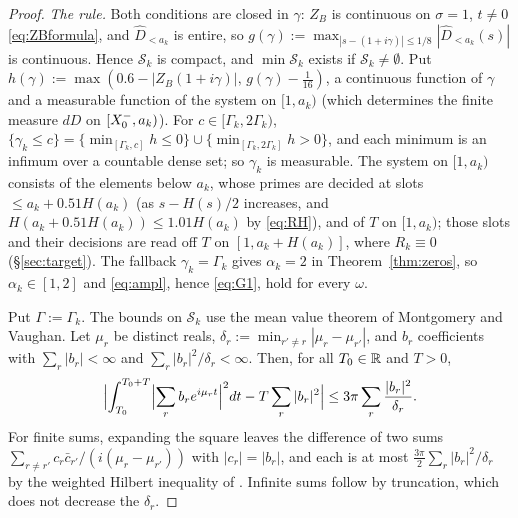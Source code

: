 \begin{proof}
\emph{The rule.} Both conditions are closed in $\gamma$: $Z_B$ is continuous on $\sigma=1$, $t\ne0$ \eqref{eq:ZBformula}, and
$\widehat D_{<a_k}$ is entire, so $g(\gamma):=\max_{|s-(1+i\gamma)|\le1/8}|\widehat D_{<a_k}(s)|$ is continuous. Hence $\mathcal S_k$ is
compact, and $\min\mathcal S_k$ exists if $\mathcal S_k\ne\emptyset$. Put $h(\gamma):=\max(0.6-|Z_B(1+i\gamma)|,\,g(\gamma)-\frac1{16})$, a
continuous function of $\gamma$ and a measurable function of the system on $[1,a_k)$ (which determines the finite measure $dD$ on
$[X_0^{-},a_k)$). For $c\in[\Gamma_k,2\Gamma_k)$, $\{\gamma_k\le c\}=\{\min_{[\Gamma_k,c]}h\le0\}\cup\{\min_{[\Gamma_k,2\Gamma_k]}h>0\}$, and each
minimum is an infimum over a countable dense set; so $\gamma_k$ is measurable. The system on $[1,a_k)$ consists of the elements
below $a_k$, whose primes are decided at slots $\le a_k+0.51H(a_k)$ (as $s-H(s)/2$ increases, and $H(a_k+0.51H(a_k))\le1.01H(a_k)$
by \eqref{eq:RH}), and of $T$ on $[1,a_k)$; those slots
and their decisions are read off $T$ on $[1,a_k+H(a_k)]$, where $R_k\equiv0$ (\S\ref{sec:target}). The fallback $\gamma_k=\Gamma_k$
gives $\alpha_k=2$ in Theorem~\ref{thm:zeros}, so $\alpha_k\in[1,2]$ and \eqref{eq:ampl}, hence \eqref{eq:G1}, hold for every
$\omega$.

Put $\Gamma:=\Gamma_k$. The bounds on $\mathcal S_k$ use the mean value theorem of Montgomery and Vaughan. Let $\mu_r$ be distinct reals,
$\delta_r:=\min_{r'\ne r}|\mu_r-\mu_{r'}|$, and $b_r$ coefficients with $\sum_r|b_r|<\infty$ and $\sum_r|b_r|^2/\delta_r<\infty$. Then, for
all $T_0\in\mathbb{R}$ and $T>0$,
\begin{equation}\label{eq:MV}
  \Bigl|\int_{T_0}^{T_0+T}\Bigl|\sum_rb_re^{i\mu_rt}\Bigr|^2dt-T\sum_r|b_r|^2\Bigr|\le3\pi\sum_r\frac{|b_r|^2}{\delta_r}.
\end{equation}
For finite sums, expanding the square leaves the difference of two sums $\sum_{r\ne r'}c_r\bar c_{r'}/(i(\mu_r-\mu_{r'}))$ with
$|c_r|=|b_r|$, and each is at most $\frac{3\pi}2\sum_r|b_r|^2/\delta_r$ by the weighted Hilbert inequality of
\cite{MontgomeryVaughan1974}. Infinite sums follow by truncation, which does not decrease the $\delta_r$.


\end{proof}
